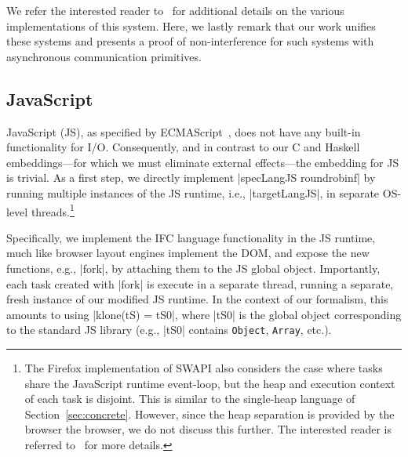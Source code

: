 We refer the interested reader to~\cite{lio,stefan:addressing-covert} for
additional details on the various implementations of this system.
%
Here, we lastly remark that our work unifies these systems and
presents a proof of non-interference for such systems with asynchronous
communication primitives.


\subsection{JavaScript}
\label{sec:real:js}

JavaScript (JS), as specified by ECMAScript~\tocite{}, does not have any
built-in functionality for I/O.
%
Consequently, and in contrast to our C and Haskell embeddings---for
which we must eliminate external effects---the embedding for JS is
trivial.
%
As a first step, we directly implement |specLangJS roundrobinf| by
running multiple instances of the JS runtime, i.e., |targetLangJS|, in
separate OS-level threads.\footnote{
 The Firefox implementation of SWAPI also considers the case where
 tasks share the JavaScript runtime event-loop, but the heap and
 execution context of each task is disjoint. This is similar to the
 single-heap language of Section~\ref{sec:concrete}.  However, since the heap
 separation is provided by the browser the browser, we do not discuss
 this further. The interested reader is referred to~\tocite{} for more
 details.
}

Specifically, we implement the IFC language functionality in the JS
runtime, much like browser layout engines implement the DOM, and
expose the new functions, e.g., |fork|, by attaching them to the JS
global object.
%
Importantly, each task created with |fork| is execute in a separate
thread, running a separate, fresh instance of our modified JS runtime.
%
In the context of our formalism, this amounts to using |klone(tS) =
tS0|, where |tS0| is the global object corresponding to the standard
JS library (e.g., |tS0| contains \texttt{Object}, \texttt{Array},
etc.).

